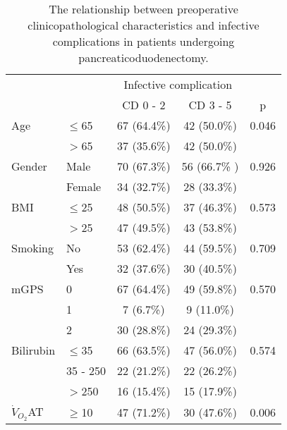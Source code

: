 \begin{table}[p]
	\centering
	\caption{The relationship between preoperative clinicopathological characteristics and infective complications in patients undergoing pancreaticoduodenectomy.}
	\label{table:crp_comp_preop_factors}
	\renewcommand{\arraystretch}{1.5} %
	\setlength{\tabcolsep}{12pt} %
	\begin{tabular}{|l l c c c|}
		\hline
		                  &          & \multicolumn{2}{c}{Infective complication} &  \\
		                  &          & CD 0 - 2    & CD 3 - 5                       & p     \\ \hline
		Age               & $\leq$65 & 67 (64.4\%) & 42 (50.0\%)                    & 0.046 \\
		                  & $>$65    & 37 (35.6\%) & 42 (50.0\%)                    &  \\
		Gender            & Male     & 70 (67.3\%) & 56 (66.7\% )                   & 0.926 \\
		                  & Female   & 34 (32.7\%) & 28 (33.3\%)                    &  \\
		BMI               & $\leq$25 & 48 (50.5\%) & 37 (46.3\%)                    & 0.573 \\
		                  & $>$25    & 47 (49.5\%) & 43 (53.8\%)                    &  \\
		Smoking           & No       & 53 (62.4\%) & 44 (59.5\%)                    & 0.709 \\
		                  & Yes      & 32 (37.6\%) & 30 (40.5\%)                    &  \\
		mGPS              & 0        & 67 (64.4\%) & 49 (59.8\%)                    & 0.570 \\
		                  & 1        & 7 (6.7\%)   & 9 (11.0\%)                     &  \\
		                  & 2        & 30 (28.8\%) & 24 (29.3\%)                    &  \\
		Bilirubin         & $\leq$35 & 66 (63.5\%) & 47 (56.0\%)                    & 0.574 \\
		                  & 35 - 250 & 22 (21.2\%) & 22 (26.2\%)                    &  \\
		                  & $>$250   & 16 (15.4\%) & 15 (17.9\%)                    &  \\
		$\dot{V}_{O_2}$AT & $\geq$10 & 47 (71.2\%) & 30 (47.6\%)                    & 0.006 \\

\end{tabular}
\end{table}
